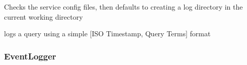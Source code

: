 \documentclass[letterpaper,10pt,english]{sphinxmanual}
\begin{document}
\begin{fulllineitems}
\begin{fulllineitems}
Checks the service config files, then defaults to creating 
a log directory in the current working directory

\end{fulllineitems}


\begin{fulllineitems}
\label{api3.0:puppy.logging.QueryLogger.log}
logs a query using a simple {[}ISO Timestamp, Query Terms{]} format

\end{fulllineitems}


\end{fulllineitems}



\subsubsection{EventLogger}
\label{api3.0:eventlogger}
\end{document}

